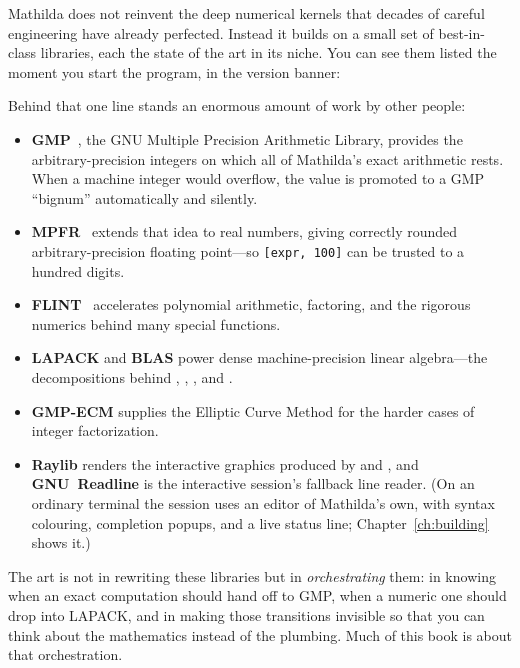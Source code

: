 Mathilda does not reinvent the deep numerical kernels that decades of careful
engineering have already perfected. Instead it builds on a small set of
best-in-class libraries, each the state of the art in its niche. You can see them
listed the moment you start the program, in the version banner:


Behind that one line stands an enormous amount of work by other people:

\begin{itemize}
  \item \textbf{GMP}~\cite{gmp}, the GNU Multiple Precision Arithmetic Library, provides the
        arbitrary-precision integers on which all of Mathilda's exact arithmetic
        rests. When a machine integer would overflow, the value is promoted to a
        GMP ``bignum'' automatically and silently.
  \item \textbf{MPFR}~\cite{mpfr} extends that idea to real numbers, giving correctly rounded
        arbitrary-precision floating point---so \texttt{[expr, 100]} can be
        trusted to a hundred digits.
  \item \textbf{FLINT}~\cite{flint} accelerates polynomial arithmetic, factoring, and the
        rigorous numerics behind many special functions.
  \item \textbf{LAPACK} and \textbf{BLAS}
        power dense machine-precision linear algebra---the decompositions behind
        , , , and
        .
  \item \textbf{GMP-ECM} supplies the Elliptic Curve Method for the harder cases
        of integer factorization.
  \item \textbf{Raylib} renders the interactive graphics produced by  and
        , and \textbf{GNU~Readline} is the interactive session's
        fallback line reader. (On an ordinary terminal the session uses an editor
        of Mathilda's own, with syntax colouring, completion popups, and a live
        status line; Chapter~\ref{ch:building} shows it.)
\end{itemize}

The art is not in rewriting these libraries but in \emph{orchestrating} them: in
knowing when an exact computation should hand off to GMP, when a numeric one
should drop into LAPACK, and in making those transitions invisible so that you can
think about the mathematics instead of the plumbing. Much of this book is about
that orchestration.

